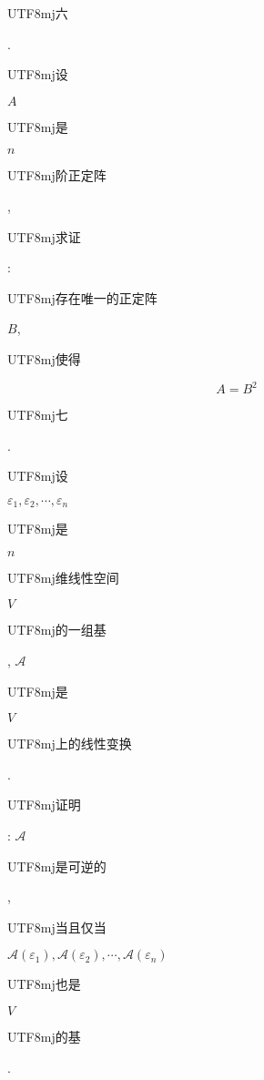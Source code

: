 \documentclass[10pt]{article}
\begin{document}
\begin{CJK}{UTF8}{mj}六\end{CJK}. \begin{CJK}{UTF8}{mj}设\end{CJK} $A$ \begin{CJK}{UTF8}{mj}是\end{CJK} $n$ \begin{CJK}{UTF8}{mj}阶正定阵\end{CJK}, \begin{CJK}{UTF8}{mj}求证\end{CJK}: \begin{CJK}{UTF8}{mj}存在唯一的正定阵\end{CJK} $B$, \begin{CJK}{UTF8}{mj}使得\end{CJK}
$$
A=B^{2}
$$
\begin{CJK}{UTF8}{mj}七\end{CJK}. \begin{CJK}{UTF8}{mj}设\end{CJK} $\varepsilon_{1}, \varepsilon_{2}, \cdots, \varepsilon_{n}$ \begin{CJK}{UTF8}{mj}是\end{CJK} $n$ \begin{CJK}{UTF8}{mj}维线性空间\end{CJK} $V$ \begin{CJK}{UTF8}{mj}的一组基\end{CJK}, $\mathscr{A}$ \begin{CJK}{UTF8}{mj}是\end{CJK} $V$ \begin{CJK}{UTF8}{mj}上的线性变换\end{CJK}. \begin{CJK}{UTF8}{mj}证明\end{CJK}: $\mathscr{A}$ \begin{CJK}{UTF8}{mj}是可逆的\end{CJK}, \begin{CJK}{UTF8}{mj}当且仅当\end{CJK} $\mathscr{A}\left(\varepsilon_{1}\right), \mathscr{A}\left(\varepsilon_{2}\right), \cdots, \mathscr{A}\left(\varepsilon_{n}\right)$ \begin{CJK}{UTF8}{mj}也是\end{CJK} $V$ \begin{CJK}{UTF8}{mj}的基\end{CJK}.
\end{document}
